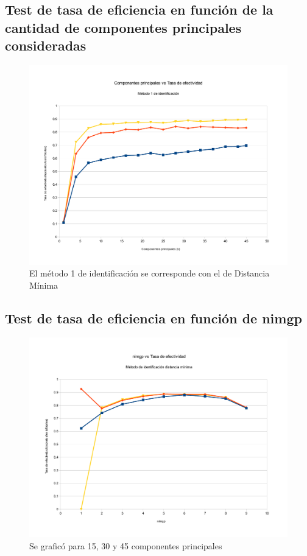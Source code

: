 \subsection{Test de tasa de eficiencia en función de la cantidad de componentes principales consideradas}
\begin{figure}[H]{}
\centering
\includegraphics[scale=0.5]{graphs/componentesPrincipalesVsTasaDeEfectividadM1.pdf}
\caption{El método 1 de identificación se corresponde con el de Distancia Mínima}
\label{CPvsTE}
\end{figure}

\subsection{Test de tasa de eficiencia en función de nimgp}
\begin{figure}[H]{}
\centering
\includegraphics[scale=0.5]{graphs/nimgpVsTasaDeEfectividad.pdf}
\caption{Se graficó para 15, 30 y 45 componentes principales}
\label{nimgpvsTE}
\end{figure}

